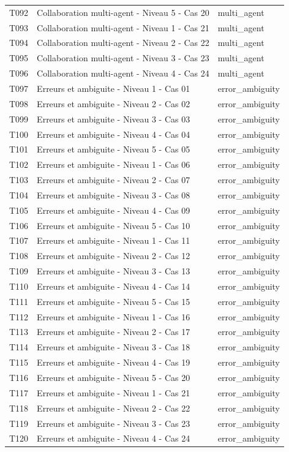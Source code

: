 \begin{longtable}{@{}lll@{}}
T092 & Collaboration multi-agent - Niveau 5 - Cas 20 & multi\_agent \\
T093 & Collaboration multi-agent - Niveau 1 - Cas 21 & multi\_agent \\
T094 & Collaboration multi-agent - Niveau 2 - Cas 22 & multi\_agent \\
T095 & Collaboration multi-agent - Niveau 3 - Cas 23 & multi\_agent \\
T096 & Collaboration multi-agent - Niveau 4 - Cas 24 & multi\_agent \\
T097 & Erreurs et ambiguite - Niveau 1 - Cas 01 & error\_ambiguity \\
T098 & Erreurs et ambiguite - Niveau 2 - Cas 02 & error\_ambiguity \\
T099 & Erreurs et ambiguite - Niveau 3 - Cas 03 & error\_ambiguity \\
T100 & Erreurs et ambiguite - Niveau 4 - Cas 04 & error\_ambiguity \\
T101 & Erreurs et ambiguite - Niveau 5 - Cas 05 & error\_ambiguity \\
T102 & Erreurs et ambiguite - Niveau 1 - Cas 06 & error\_ambiguity \\
T103 & Erreurs et ambiguite - Niveau 2 - Cas 07 & error\_ambiguity \\
T104 & Erreurs et ambiguite - Niveau 3 - Cas 08 & error\_ambiguity \\
T105 & Erreurs et ambiguite - Niveau 4 - Cas 09 & error\_ambiguity \\
T106 & Erreurs et ambiguite - Niveau 5 - Cas 10 & error\_ambiguity \\
T107 & Erreurs et ambiguite - Niveau 1 - Cas 11 & error\_ambiguity \\
T108 & Erreurs et ambiguite - Niveau 2 - Cas 12 & error\_ambiguity \\
T109 & Erreurs et ambiguite - Niveau 3 - Cas 13 & error\_ambiguity \\
T110 & Erreurs et ambiguite - Niveau 4 - Cas 14 & error\_ambiguity \\
T111 & Erreurs et ambiguite - Niveau 5 - Cas 15 & error\_ambiguity \\
T112 & Erreurs et ambiguite - Niveau 1 - Cas 16 & error\_ambiguity \\
T113 & Erreurs et ambiguite - Niveau 2 - Cas 17 & error\_ambiguity \\
T114 & Erreurs et ambiguite - Niveau 3 - Cas 18 & error\_ambiguity \\
T115 & Erreurs et ambiguite - Niveau 4 - Cas 19 & error\_ambiguity \\
T116 & Erreurs et ambiguite - Niveau 5 - Cas 20 & error\_ambiguity \\
T117 & Erreurs et ambiguite - Niveau 1 - Cas 21 & error\_ambiguity \\
T118 & Erreurs et ambiguite - Niveau 2 - Cas 22 & error\_ambiguity \\
T119 & Erreurs et ambiguite - Niveau 3 - Cas 23 & error\_ambiguity \\
T120 & Erreurs et ambiguite - Niveau 4 - Cas 24 & error\_ambiguity \\
\bottomrule
\end{longtable}
\endgroup
